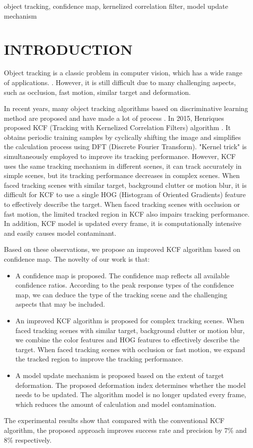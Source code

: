 \documentclass[conference]{IEEEtran}
\begin{document}
\begin{IEEEkeywords}
object tracking, confidence map, kernelized correlation filter, model update mechanism
\end{IEEEkeywords}

\section{INTRODUCTION}
Object tracking is a classic problem in computer vision, which has a wide range of applications. \cite{Survey,Survey2}. 
However, it is still difficult due to many challenging aspects, such as occlusion, fast motion, similar target and deformation.

In recent years, many object tracking algorithms based on discriminative learning method are proposed and have made a lot of process \cite{Discriminative}. 
In 2015, Henriques proposed KCF (Tracking with Kernelized Correlation Filters) algorithm \cite{KCF}. 
It obtains periodic training samples by cyclically shifting the image and simplifies the calculation process using DFT (Discrete Fourier Transform). 
"Kernel trick" is simultaneously employed to improve its tracking performance. 
However, KCF uses the same tracking mechanism in different scenes, it can track accurately in simple scenes, but its tracking performance decreases in complex scenes.
When faced tracking scenes with similar target, background clutter or motion blur, it is difficult for KCF to use a single HOG (Histogram of Oriented Gradients) feature to effectively describe the target.
When faced tracking scenes with occlusion or fast motion, the limited tracked region in KCF also impairs tracking performance.
In addition, KCF model is updated every frame, it is computationally intensive and easily causes model contaminant.

Based on these observations, we propose an improved KCF algorithm based on confidence map.
The novelty of our work is that:
\begin{itemize}
\item A confidence map is proposed. The confidence map reflects all available confidence ratios. According to the peak response types of the confidence map, we can deduce the type of the tracking scene and the challenging aspects that may be included.  
\item An improved KCF algorithm is proposed for complex tracking scenes.
When faced tracking scenes with similar target, background clutter or motion blur, we combine the color features and HOG features to effectively describe the target.
When faced tracking scenes with occlusion or fast motion, we expand the tracked region to improve the tracking performance.
\item A model update mechanism is proposed based on the extent of target deformation.
The proposed deformation index determines whether the model needs to be updated.
The algorithm model is no longer updated every frame, which reduces the amount of calculation and model contamination. 
\end{itemize}
The experimental results show that compared with the conventional KCF algorithm, the proposed approach improves success rate and precision by 7\% and 8\% respectively.
\end{document}
